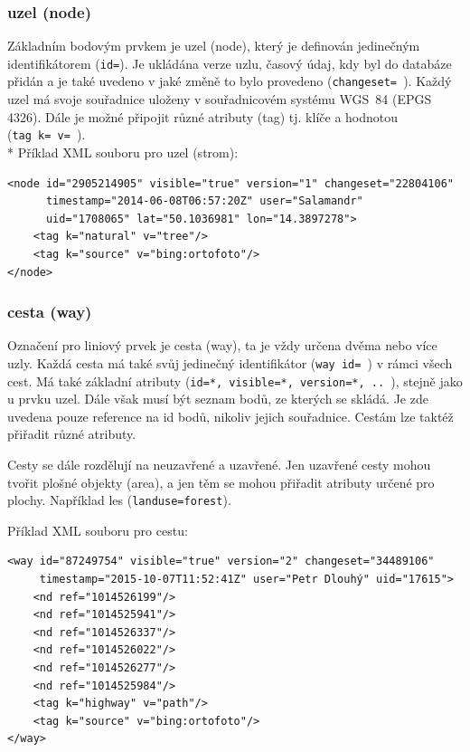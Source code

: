 \subsubsection{uzel (node) }

Základním bodovým prvkem je uzel (node), který je definován jedinečným
identifikátorem ({\tt id=}). 
Je ukládána verze uzlu, časový údaj, kdy byl do databáze přidán
a je také uvedeno v jaké změně to bylo provedeno ({\tt changeset=~}).
Každý uzel má svoje souřadnice uloženy v souřadnicovém systému WGS~84 (EPGS 4326). 
Dále je možné připojit různé atributy (tag) tj. klíče a hodnotou ({\tt tag~k=~v=~}).
\\*
Příklad XML souboru pro uzel (strom):

{\scriptsize \begin{lstlisting}
<node id="2905214905" visible="true" version="1" changeset="22804106" 
      timestamp="2014-06-08T06:57:20Z" user="Salamandr" 
      uid="1708065" lat="50.1036981" lon="14.3897278">
    <tag k="natural" v="tree"/>
    <tag k="source" v="bing:ortofoto"/>
</node>
\end{lstlisting} }

\subsubsection{cesta (way) }

Označení pro liniový prvek je cesta (way), ta je vždy určena dvěma nebo více uzly.
Každá cesta má také svůj jedinečný identifikátor ({\tt way~id=~}) v rámci všech cest.
Má také základní atributy ({\tt id=*, visible=*, version=*, .. }), 
stejně jako u prvku uzel.
Dále však musí být seznam bodů, ze kterých se skládá.
Je zde uvedena pouze reference na id bodů, nikoliv jejich souřadnice.
Cestám lze taktéž přiřadit různé atributy.

Cesty se dále rozdělují na neuzavřené a uzavřené.
Jen uzavřené cesty mohou tvořit plošné objekty (area),
a jen těm se mohou přiřadit atributy určené pro plochy.
Například les ({\tt landuse=forest}).

Příklad XML souboru pro cestu:

{\scriptsize
\begin{lstlisting}
<way id="87249754" visible="true" version="2" changeset="34489106"
     timestamp="2015-10-07T11:52:41Z" user="Petr Dlouhý" uid="17615">
    <nd ref="1014526199"/>
    <nd ref="1014525941"/>
    <nd ref="1014526337"/>
    <nd ref="1014526022"/>
    <nd ref="1014526277"/>
    <nd ref="1014525984"/>
    <tag k="highway" v="path"/>
    <tag k="source" v="bing:ortofoto"/>
</way>
\end{lstlisting}
}
      
